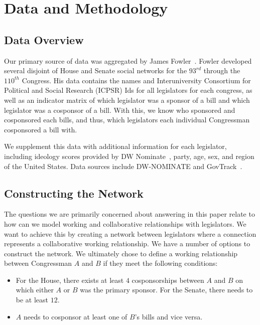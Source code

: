 \section{Data and Methodology}

\subsection{Data Overview}

Our primary source of data was aggregated by James Fowler~\cite{Fowler}.
Fowler developed several disjoint of House and Senate social networks for the
$93^{rd}$ through the $110^{th}$ Congress. His data contains the names and
Interuniversity Consortium for Political and Social Research (ICPSR) Ids for all
legislators for each congress, as well as an indicator matrix of which
legislator was a sponsor of a bill and which legislator was a cosponsor of a
bill. With this, we know who sponsored and cosponsored each bills, and thus, 
which legislators each individual Congressman cosponsored a bill with.

We supplement this data with additional information for each legislator, 
including ideology scores provided by DW Nominate~\cite{DW-NOMINATE}, party, 
age, sex, and region of the United States. Data sources include DW-NOMINATE and 
GovTrack~\cite{GovTrack}.

\subsection{Constructing the Network}

The questions we are primarily concerned about answering in this paper relate 
to how can we model working and collaborative relationships with legislators. 
We want to achieve this by creating a network between legislators where a 
connection represents a collaborative working relationship. We have a number of 
options to construct the network. We ultimately chose to define a working 
relationship between Congressman $A$ and $B$ if they meet the following 
conditions:

\begin{itemize}
	\item For the House, there exists at least $4$ cosponsorships between $A$ and $B$ 
	on which either $A$ or $B$ was the primary sponsor. For the Senate, there 
	needs to be at least $12$.
	\item $A$ needs to cosponsor at least one of $B$'s bills and vice versa.
\end{itemize}

